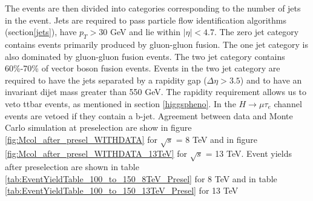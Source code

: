 \documentclass[oneside, letterpaper, oldfontcommands]{memoir}
\begin{document}
\qquad The events are then divided into categories corresponding to the number of jets in the event. Jets are required to pass particle flow identification algorithms (section\ref{jets}), have $p_{T} > 30$ GeV and lie within $|\eta| < 4.7$. The zero jet category contains events primarily produced by gluon-gluon fusion. The one jet category is also dominated by gluon-gluon fusion events. The two jet category contains 60\%-70\% of vector boson fusion events. Events in the two jet category are required to have the jets separated by a rapidity gap ($\Delta\eta > 3.5$) and to have an invariant dijet mass greater than 550 GeV. The rapidity requirement allows us to veto ttbar events, as mentioned in section \ref{higgspheno}. In the $H \rightarrow \mu\tau_{e}$ channel events are vetoed if they contain a b-jet. Agreement between data and Monte Carlo simulation at preselection are show in figure \ref{fig:Mcol_after_presel_WITHDATA} for $\sqrt{s}$ = 8 TeV and in figure \ref{fig:Mcol_after_presel_WITHDATA_13TeV} for $\sqrt{s}$ = 13 TeV.
Event yields after preselection are shown in table \ref{tab:EventYieldTable_100_to_150_8TeV_Presel} for 8 TeV and in table \ref{tab:EventYieldTable_100_to_150_13TeV_Presel} for 13 TeV
\end{document}
